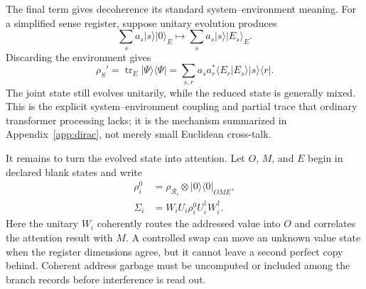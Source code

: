 \documentclass[
  aps,
  reprint,
  superscriptaddress,
  floatfix,
  nofootinbib,
  longbibliography
]{revtex4-2}
\begin{document}
The final term gives decoherence its standard system--environment meaning.
For a simplified sense register, suppose unitary evolution produces
\begin{equation}
 \sum_s a_s|s\rangle|0\rangle_E
 \longmapsto
 \sum_s a_s|s\rangle|E_s\rangle_E .
\label{eq:eqia-environment}
\end{equation}
Discarding the environment gives
\begin{equation}
 \rho_S'
 =\operatorname{tr}_E|\Psi\rangle\langle\Psi|
 =\sum_{s,r}a_sa_r^*\langle E_r|E_s\rangle
 |s\rangle\langle r| .
\label{eq:eqia-partial-trace}
\end{equation}
The joint state still evolves unitarily, while the reduced state is generally
mixed.  This is the explicit system--environment coupling and partial trace
that ordinary transformer processing lacks; it is the mechanism summarized
in Appendix~\ref{app:dirac}, not merely small Euclidean cross-talk.

It remains to turn the evolved state into attention.  Let $O$, $M$, and $E$
begin in declared blank states and write
\begin{equation}
\begin{aligned}
 \rho_i^0
 &=\rho_{\mathcal R_i}\otimes
 |0\rangle\langle0|_{OME},\\
 \Sigma_i
 &=W_iU_i\rho_i^0U_i^\dagger W_i^\dagger .
\end{aligned}
\label{eq:eqia-meter-state}
\end{equation}
Here the unitary $W_i$ coherently routes the addressed value into $O$ and
correlates the attention result with $M$.  A controlled swap can move an
unknown value state when the register dimensions agree, but it cannot leave a
second perfect copy behind.  Coherent address garbage must be uncomputed or
included among the branch records before interference is read out.
\end{document}
